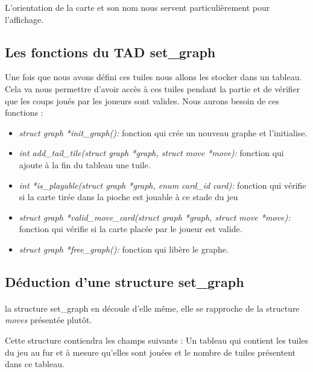 \documentclass[12pt]{article}
\begin{document}
L'orientation de la carte et son nom nous servent particulièrement pour l'affichage.

\subsection{Les fonctions du TAD set\_graph}

Une fois que nous avons défini ces tuiles nous allons les stocker dans un tableau. Cela va nous permettre d'avoir accès à ces tuiles pendant la partie et de vérifier que les coups joués par les joueurs sont valides. Nous aurons besoin de ces fonctions :

\begin{itemize}
\item \textit{struct graph *init\_graph():} fonction qui crée un nouveau graphe et l'initialise.\\
\item \textit{int add\_tail\_tile(struct graph *graph, struct move *move):} fonction qui ajoute à la fin du tableau une tuile.\\
\item \textit{int *is\_playable(struct graph *graph, enum card\_id card):} fonction qui vérifie si la carte tirée dans la pioche est jouable à ce stade du jeu\\
\item \textit{struct graph *valid\_move\_card(struct graph *graph, struct move *move):} fonction qui vérifie si la carte placée par le joueur est valide.\\
\item \textit{struct graph *free\_graph():} fonction qui libère le graphe.\\

\end{itemize}

\subsection{Déduction d'une structure set\_graph}

\paragraph{} la structure set\_graph en découle d'elle même, elle se rapproche de la structure \textit{moves} présentée plutôt.

Cette structure contiendra les champs suivants : Un tableau qui contient les tuiles du jeu au fur et à mesure qu'elles sont jouées et le nombre de tuiles présentent dans ce tableau.
\end{document}
